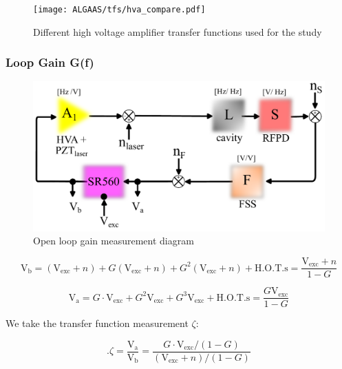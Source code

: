 \begin{figure}[H]
    \centering
    \texttt{[image: ALGAAS/tfs/hva\_compare.pdf]}
    \caption{Different high voltage amplifier transfer functions used for the study}
    \label{fig:hvacompare}
\end{figure}



\subsubsection{Loop Gain G(f)}
\begin{figure}[H]
  \begin{center}
    \includegraphics[width=\textwidth]{figs/ALGAAS/olg_meas_diagram.pdf}
    \caption{Open loop gain measurement diagram}
  \end{center}
  \label{fig:OLGmath}
\end{figure}

\begin{equation}
    \mathrm{V}_\mathrm{b} = (\mathrm{V}_\mathrm{exc}+n) + G(\mathrm{V}_\mathrm{exc}+n) + G^2 (\mathrm{V}_\mathrm{exc}+n) + \mathrm{H.O.T.s} = \frac{\mathrm{V}_\mathrm{exc} + n}{1-G}
\end{equation}

\begin{equation}
    \mathrm{V}_\mathrm{a} = G\cdot \mathrm{V}_\mathrm{exc} + G^2\mathrm{V}_\mathrm{exc} + G^3\mathrm{V}_\mathrm{exc} + \mathrm{H.O.T.s}  = \frac{G\mathrm{V}_\mathrm{exc}}{1-G}
\end{equation}

We take the transfer function measurement $\zeta$:

\begin{equation}.
    \zeta = \frac{\mathrm{V}_\mathrm{a}}{\mathrm{V}_\mathrm{b}} = \frac{G \cdot \mathrm{V}_\mathrm{exc}/(1-G)}{(\mathrm{V}_\mathrm{exc}+n)/(1-G)}
\end{equation}


